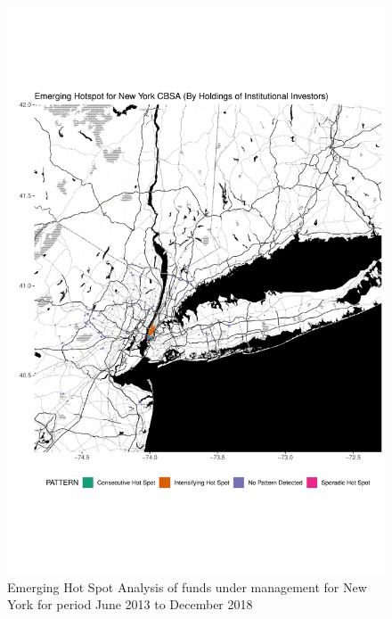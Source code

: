 \begin{figure}
	\centering
	\includegraphics[width=1\linewidth]{Figures/ChapterIV/NY_Money_EH}
	\caption[Emerging Hot Spot Analysis of Funds Under Management for New York CBSA 2013-2018]{Emerging Hot Spot Analysis of funds under management for New York for period June 2013 to December 2018}
	\label{fig:NYCmoneyhotspot}
\end{figure}

